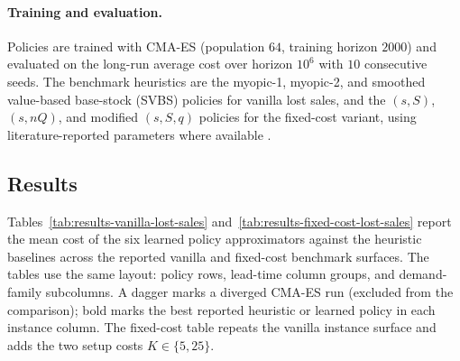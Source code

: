 \documentclass[11pt]{article}
\begin{document}
\paragraph{Training and evaluation.}
Policies are trained with CMA-ES (population $64$, training horizon $2000$) and evaluated on the
long-run average cost over horizon $10^6$ with $10$ consecutive seeds. The benchmark
heuristics are the myopic-1, myopic-2, and smoothed value-based base-stock (SVBS) policies for
vanilla lost sales, and the $(s,S)$, $(s,nQ)$, and modified $(s,S,q)$ policies for the fixed-cost
variant, using literature-reported parameters where available
\citep{Zipkin2008OldSystems,Bijvank2015ParametricPolicies}.

\subsection{Results}

Tables~\ref{tab:results-vanilla-lost-sales} and~\ref{tab:results-fixed-cost-lost-sales} report the
mean cost of the six learned policy approximators against the heuristic baselines across the reported
vanilla and fixed-cost benchmark surfaces. The tables use the same layout: policy rows, lead-time
column groups, and demand-family subcolumns. A dagger marks a diverged CMA-ES run (excluded from the
comparison); bold marks the best reported heuristic or learned policy in each instance column. The
fixed-cost table repeats the vanilla instance surface and adds the two setup costs $K\in\{5,25\}$.
\end{document}
